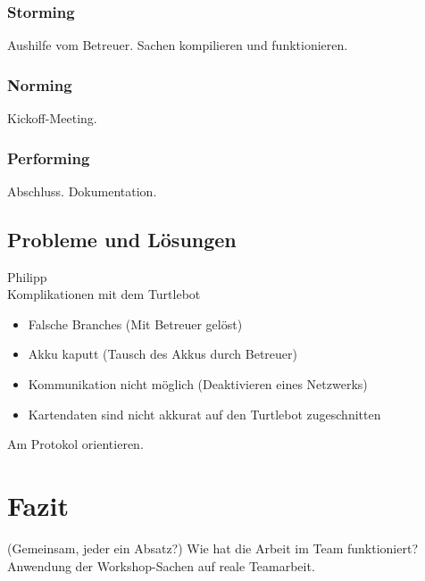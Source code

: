 \documentclass[a4paper,12pt,headsepline]{scrartcl}
\begin{document}
	\subsubsection{Storming}
		Aushilfe vom Betreuer. Sachen kompilieren und funktionieren.
	\subsubsection{Norming}
		Kickoff-Meeting. 
	\subsubsection{Performing}
		Abschluss. Dokumentation.
	\subsection{Probleme und Lösungen}
		Philipp\\
		Komplikationen mit dem Turtlebot
		\begin{itemize}
			\item Falsche Branches (Mit Betreuer gelöst)
			\item Akku kaputt (Tausch des Akkus durch Betreuer)
			\item Kommunikation nicht möglich (Deaktivieren eines Netzwerks)
			\item Kartendaten sind nicht akkurat auf den Turtlebot zugeschnitten
		\end{itemize}
		Am Protokol orientieren.
	\section{Fazit}
		(Gemeinsam, jeder ein Absatz?)
		Wie hat die Arbeit im Team funktioniert? Anwendung der Workshop-Sachen auf reale Teamarbeit.
\end{document}
